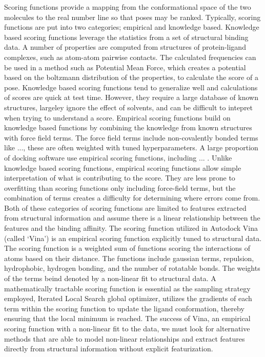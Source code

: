 \documentclass[journal=jcisd8,manuscript=article]{achemso}
\begin{document}
Scoring functions provide a mapping from the conformational space of the two molecules to the real number line so that poses may be ranked. Typically, scoring functions are put into two categories; empirical and knowledge based. Knowledge based scoring functions leverage the statistics from a set of structural binding data. A number of properties are computed from structures of protein-ligand complexes, such as atom-atom pairwise contacts. The calculated frequencies can be used in a method such as Potential Mean Force, which creates a potential based on the boltzmann distribution of the properties, to calculate the score of a pose. Knowledge based scoring functions tend to generalize well and calculations of scores are quick at test time. However, they require a large database of known structures, largeley ignore the effect of solvents, and can be difficult to intepret when trying to understand a score. Empirical scoring functions build on knowledge based functions by combining the knowledge from known structures with force field terms. The force field terms include non-covalently bonded terms like ..., these are often weighted with tuned hyperparameters. A large proportion of docking software use empirical scoring functions, including ... \cite{}. Unlike knowledge based scoring functions, empirical scoring functions allow simple interpretation of what is contributing to the score. They are less prone to overfitting than scoring functions only including force-field terms, but the combination of terms creates a difficulty for determining where errors come from. Both of these categories of scoring functions are limited to features extracted from structural information and assume there is a linear relationship between the features and the binding affinity. The scoring function utilized in Autodock Vina (called `Vina') is an empirical scoring function explicitly tuned to structural data\cite{trott2010autodock}. The scoring function is a weighted sum of functions scoring the interactions of atoms based on their distance. The functions include gaussian terms, repulsion, hydrophobic, hydrogen bonding, and the number of rotatable bonds. The weights of the terms beind denoted by a non-linear fit to structural data. A mathematically tractable scoring function is essential as the sampling strategy employed, Iterated Local Search global optimizer, utilizes the gradients of each term within the scoring function to update the ligand conformation, thereby ensuring that the local minimum is reached. The success of Vina, an empirical scoring function with a non-linear fit to the data, we must look for alternative methods that are able to model non-linear relationships and extract features directly from structural information without explicit featurization.
\end{document}
